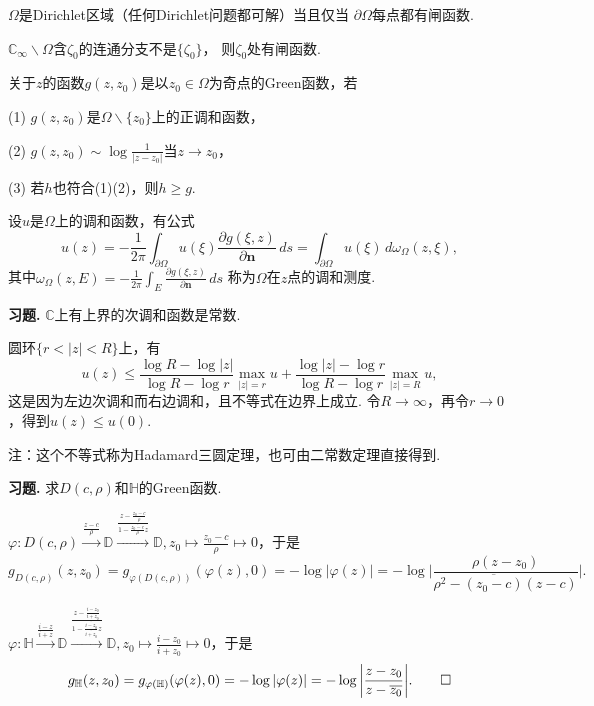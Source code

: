 \begin{proposition}$\Omega$是Dirichlet区域（任何Dirichlet问题都可解）当且仅当
$\partial\Omega$每点都有闸函数.\end{proposition}

\begin{proposition}$\mathbb{C}_\infty\backslash\Omega$含$\zeta_0$的连通分支不是$\{\zeta_0\}$，
则$\zeta_0$处有闸函数.\end{proposition}

\begin{definition}关于$z$的函数$g(z,z_0)$是以$z_0\in\Omega$为奇点的Green函数，若

(1) $g(z,z_0)$是$\Omega\backslash\{z_0\}$上的正调和函数，

(2) $\displaystyle{g(z,z_0)\sim \log\frac{1}{|z-z_0|}}$当$z\rightarrow z_0$，

(3) 若$h$也符合(1)(2)，则$h\geq g$.\end{definition}

\begin{proposition}设$u$是$\Omega$上的调和函数，有公式$$u(z)=-\frac{1}{2\pi}\int_{\partial\Omega}
u(\xi)\frac{\partial g(\xi,z)}{\partial\boldsymbol{n}}\,ds
=\int_{\partial\Omega}u(\xi)\,d\omega_\Omega(z,\xi),$$
其中$\displaystyle{\omega_\Omega(z,E)=-\frac{1}{2\pi}\int_{E}
\frac{\partial g(\xi,z)}{\partial\boldsymbol{n}}\,ds}$
称为$\Omega$在$z$点的调和测度.\end{proposition}

\textbf{习题. } $\mathbb{C}$上有上界的次调和函数是常数.

\begin{proofc}
    圆环$\{r<|z|<R\}$上，有
    $$u(z)\leq\frac{\log R-\log|z|}{\log R-\log r}\max\limits_{|z|=r}u
    +\frac{\log|z|-\log r}{\log R-\log r}\max\limits_{|z|=R}u,$$
    这是因为左边次调和而右边调和，且不等式在边界上成立.
    令$R\rightarrow\infty$，再令$r\rightarrow0$，得到$u(z)\leq u(0)$.\qedhere

    注：这个不等式称为Hadamard三圆定理，也可由二常数定理直接得到.
\end{proofc}

\textbf{习题. } 求$D(c,\rho)$和$\mathbb{H}$的Green函数.
\begin{proofc}
    $\varphi
    \colon D(c,\rho)\xrightarrow{\frac{z-c}{\rho}} \mathbb{D}
    \xrightarrow{\frac{z-\frac{z_0-c}{\rho}}{1-\frac{\overline{z_0-c}}{\rho}z}} \mathbb{D},
    z_0\mapsto\frac{z_0-c}{\rho}\mapsto0$，于是
    $$g_{D(c,\rho)}(z,z_0)=g_{\varphi(D(c,\rho))}(\varphi(z),0)=-\log|\varphi(z)|
    =-\log\bigg|\frac{\rho(z-z_0)}{\rho^2-\overline{(z_0-c)}(z-c)}\bigg|.$$

    $\varphi\colon\mathbb{H}\xrightarrow{\frac{i-z}{i+z}} \mathbb{D}
    \xrightarrow{\frac{z-\frac{i-z_0}{i+z_0}}
    {1-\frac{\overline{i-z_0}}{\overline{i+z_0}}z}} \mathbb{D},
    z_0\mapsto\frac{i-z_0}{i+z_0}\mapsto0$，于是
    $$g_\mathbb{H}(z,z_0)=g_{\varphi(\mathbb{H})}(\varphi(z),0)
    =-\log|\varphi(z)|=-\log\bigg|\frac{z-z_0}{z-\overline{z_0}}\bigg|.\qedhere$$
\end{proofc}

